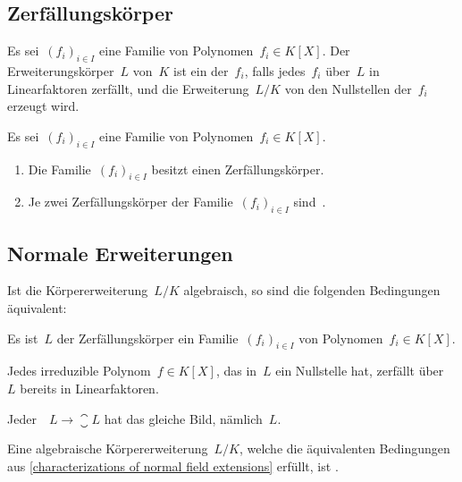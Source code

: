 \subsection{Zerfällungskörper}

\begin{definition}
  Es sei~$(f_i)_{i \in I}$ eine Familie von Polynomen~$f_i \in K[X]$.
  Der Erweiterungskörper~$L$ von~$K$ ist ein  der~$f_i$, falls jedes~$f_i$ über~$L$ in Linearfaktoren zerfällt, und die Erweiterung~$L/K$ von den Nullstellen der~$f_i$ erzeugt wird.
\end{definition}

\begin{proposition}
  Es sei~$(f_i)_{i \in I}$ eine Familie von Polynomen~$f_i \in K[X]$.
  \begin{enumerate}
    \item
      Die Familie~$(f_i)_{i \in I}$ besitzt einen Zerfällungskörper.
    \item
      Je zwei Zerfällungskörper der Familie~$(f_i)_{i \in I}$ sind~.
  \end{enumerate}
\end{proposition}



\subsection{Normale Erweiterungen}

\begin{proposition}
  \label{characterizations of normal field extensions}
  Ist die Körpererweiterung~$L/K$ algebraisch, so sind die folgenden Bedingungen äquivalent:
  \begin{equivlist}
    \item
      Es ist~$L$ der Zerfällungskörper ein Familie~$(f_i)_{i \in I}$ von Polynomen~$f_i \in K[X]$.
    \item
      Jedes irreduzible Polynom~$f \in K[X]$, das in~$L$ ein Nullstelle hat, zerfällt über~$L$ bereits in Linearfaktoren.
    \item
      Jeder~~$L \to \closure{L}$ hat das gleiche Bild, nämlich~$L$.
  \end{equivlist}
\end{proposition}

\begin{definition}
  Eine algebraische Körpererweiterung~$L/K$, welche die äquivalenten Bedingungen aus \cref{characterizations of normal field extensions} erfüllt, ist .
\end{definition}

